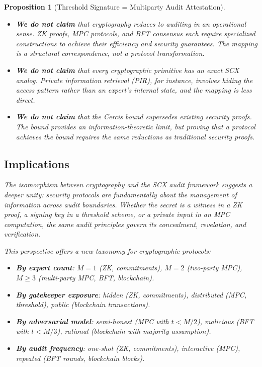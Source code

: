 \documentclass[12pt,a4paper]{article}
\newtheorem{proposition}[theorem]{Proposition}
\theoremstyle{remark}
\newcommand{\SCX}{\textsf{SCX}}
\newcommand{\Cercis}{\textsf{Cercis}}
\begin{document}
\begin{proposition}[Threshold Signature = Multiparty Audit Attestation]
\begin{itemize}[leftmargin=*]
  \item \textbf{We do not claim} that cryptography reduces to auditing in an operational sense. ZK proofs, MPC protocols, and BFT consensus each require specialized constructions to achieve their efficiency and security guarantees. The mapping is a structural correspondence, not a protocol transformation.
  \item \textbf{We do not claim} that every cryptographic primitive has an exact SCX analog. Private information retrieval (PIR), for instance, involves hiding the access pattern rather than an expert's internal state, and the mapping is less direct.
  \item \textbf{We do not claim} that the \Cercis{} bound supersedes existing security proofs. The bound provides an information-theoretic limit, but proving that a protocol achieves the bound requires the same reductions as traditional security proofs.
\end{itemize}

\subsection{Implications}

The isomorphism between cryptography and the \SCX{} audit framework suggests a deeper unity: security protocols are fundamentally about the management of information across audit boundaries. Whether the secret is a witness in a ZK proof, a signing key in a threshold scheme, or a private input in an MPC computation, the same audit principles govern its concealment, revelation, and verification.

This perspective offers a new taxonomy for cryptographic protocols:
\begin{itemize}[leftmargin=*]
  \item \textbf{By expert count}: $M = 1$ (ZK, commitments), $M = 2$ (two-party MPC), $M \geq 3$ (multi-party MPC, BFT, blockchain).
  \item \textbf{By gatekeeper exposure}: hidden (ZK, commitments), distributed (MPC, threshold), public (blockchain transactions).
  \item \textbf{By adversarial model}: semi-honest (MPC with $t < M/2$), malicious (BFT with $t < M/3$), rational (blockchain with majority assumption).
  \item \textbf{By audit frequency}: one-shot (ZK, commitments), interactive (MPC), repeated (BFT rounds, blockchain blocks).
\end{itemize}


\end{proposition}
\end{document}
